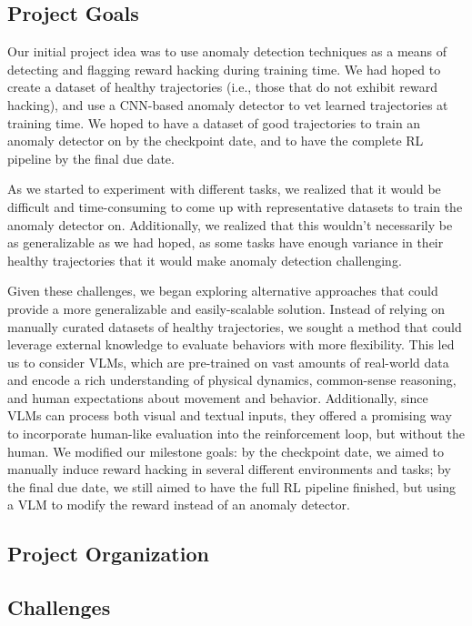 \documentclass{article}
\begin{document}
\subsection{Project Goals}
Our initial project idea was to use anomaly detection techniques as a means of detecting and flagging reward hacking during training time. We had hoped to create a dataset of healthy trajectories (i.e., those that do not exhibit reward hacking), and use a CNN-based anomaly detector to vet learned trajectories at training time. We hoped to have a dataset of good trajectories to train an anomaly detector on by the checkpoint date, and to have the complete RL pipeline by the final due date.

As we started to experiment with different tasks, we realized that it would be difficult and time-consuming to come up with representative datasets to train the anomaly detector on. Additionally, we realized that this wouldn't necessarily be as generalizable as we had hoped, as some tasks have enough variance in their healthy trajectories that it would make anomaly detection challenging. 

Given these challenges, we began exploring alternative approaches that could provide a more generalizable and easily-scalable solution. Instead of relying on manually curated datasets of healthy trajectories, we sought a method that could leverage external knowledge to evaluate behaviors with more flexibility. This led us to consider VLMs, which are pre-trained on vast amounts of real-world data and encode a rich understanding of physical dynamics, common-sense reasoning, and human expectations about movement and behavior. Additionally, since VLMs can process both visual and textual inputs, they offered a promising way to incorporate human-like evaluation into the reinforcement loop, but without the human. We modified our milestone goals: by the checkpoint date, we aimed to manually induce reward hacking in several different environments and tasks; by the final due date, we still aimed to have the full RL pipeline finished, but using a VLM to modify the reward instead of an anomaly detector.

\subsection{Project Organization}

\subsection{Challenges}
\end{document}
